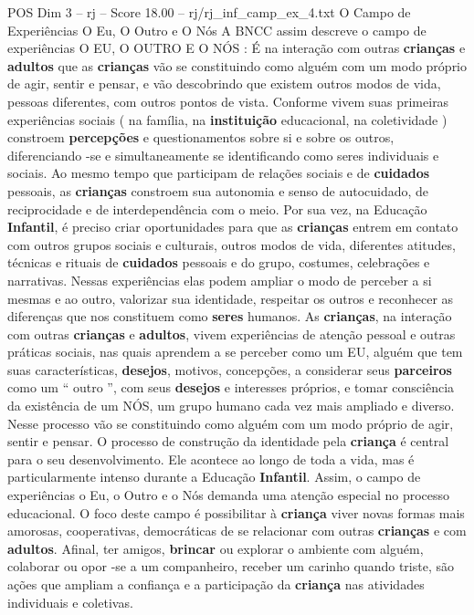 \begin{textsample}{POS Dim 3 – rj – Score 18.00 – rj/rj\_inf\_camp\_ex\_4.txt}  \label{ex:f3_pos_016}
O Campo de Experiências O Eu, O Outro e O Nós A BNCC assim descreve o campo de experiências O EU, O OUTRO E O NÓS : É na interação com outras \textbf{crianças} e \textbf{adultos} que as \textbf{crianças} vão se constituindo como alguém com um modo próprio de agir, sentir e pensar, e vão descobrindo que existem outros modos de vida, pessoas diferentes, com outros pontos de vista.
Conforme vivem suas primeiras experiências sociais ( na família, na \textbf{instituição} educacional, na coletividade ) constroem \textbf{percepções} e questionamentos sobre si e sobre os outros, diferenciando -se e simultaneamente se identificando como seres individuais e sociais.
Ao mesmo tempo que participam de relações sociais e de \textbf{cuidados} pessoais, as \textbf{crianças} constroem sua autonomia e senso de autocuidado, de reciprocidade e de interdependência com o meio.
Por sua vez, na Educação \textbf{Infantil}, é preciso criar oportunidades para que as \textbf{crianças} entrem em contato com outros grupos sociais e culturais, outros modos de vida, diferentes atitudes, técnicas e rituais de \textbf{cuidados} pessoais e do grupo, costumes, celebrações e narrativas.
Nessas experiências elas podem ampliar o modo de perceber a si mesmas e ao outro, valorizar sua identidade, respeitar os outros e reconhecer as diferenças que nos constituem como \textbf{seres} humanos.
As \textbf{crianças}, na interação com outras \textbf{crianças} e \textbf{adultos}, vivem experiências de atenção pessoal e outras práticas sociais, nas quais aprendem a se perceber como um EU, alguém que tem suas características, \textbf{desejos}, motivos, concepções, a considerar seus \textbf{parceiros} como um “ outro ”, com seus \textbf{desejos} e interesses próprios, e tomar consciência da existência de um NÓS, um grupo humano cada vez mais ampliado e diverso.
Nesse processo vão se constituindo como alguém com um modo próprio de agir, sentir e pensar.
O processo de construção da identidade pela \textbf{criança} é central para o seu desenvolvimento.
Ele acontece ao longo de toda a vida, mas é particularmente intenso durante a Educação \textbf{Infantil}.
Assim, o campo de experiências o Eu, o Outro e o Nós demanda uma atenção especial no processo educacional.
O foco deste campo é possibilitar à \textbf{criança} viver novas formas mais amorosas, cooperativas, democráticas de se relacionar com outras \textbf{crianças} e com \textbf{adultos}.
Afinal, ter amigos, \textbf{brincar} ou explorar o ambiente com alguém, colaborar ou opor -se a um companheiro, receber um carinho quando triste, são ações que ampliam a confiança e a participação da \textbf{criança} nas atividades individuais e coletivas.

\end{textsample}
